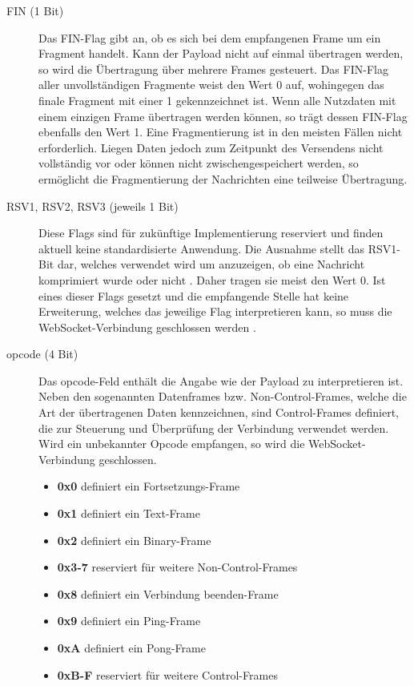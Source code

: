 \documentclass[11pt,a4paper,titlepage]{scrartcl}
\numberwithin{equation}{section}
\begin{document}
\begin{description}
	\item[FIN (1 Bit)] Das FIN-Flag gibt an, ob es sich bei dem empfangenen Frame um ein Fragment handelt. Kann der Payload nicht auf einmal übertragen werden, so wird die Übertragung über mehrere Frames gesteuert. Das FIN-Flag aller unvollständigen Fragmente weist den Wert 0 auf, wohingegen das finale Fragment mit einer 1 gekennzeichnet ist. Wenn alle Nutzdaten mit einem einzigen Frame übertragen werden können, so trägt dessen FIN-Flag ebenfalls den Wert 1. Eine Fragmentierung ist in den meisten Fällen nicht erforderlich. Liegen Daten jedoch zum Zeitpunkt des Versendens nicht vollständig vor oder können nicht zwischengespeichert werden, so ermöglicht die Fragmentierung der Nachrichten eine teilweise Übertragung. 
	\item[RSV1, RSV2, RSV3 (jeweils 1 Bit)] Diese Flags sind für zukünftige Implementierung reserviert und finden aktuell keine standardisierte Anwendung. Die Ausnahme stellt das RSV1-Bit dar, welches verwendet wird um anzuzeigen, ob eine Nachricht komprimiert wurde oder nicht \autocite{internet_assigned_numbers_authority_websocket_2011}. Daher tragen sie meist den Wert 0. Ist eines dieser Flags gesetzt und die empfangende Stelle hat keine Erweiterung, welches das jeweilige Flag interpretieren kann, so muss die WebSocket-Verbindung geschlossen werden \autocite[27]{fette_websocket_2011}. 
	\item[opcode (4 Bit)] Das opcode-Feld enthält die Angabe wie der Payload zu interpretieren ist. Neben den sogenannten Datenframes bzw. Non-Control-Frames, welche die Art der übertragenen Daten kennzeichnen, sind Control-Frames definiert, die zur Steuerung und Überprüfung der Verbindung verwendet werden. Wird ein unbekannter Opcode empfangen, so wird die WebSocket-Verbindung geschlossen.
	\begin{itemize}
		\item \textbf{0x0} definiert ein Fortsetzungs-Frame
		\item \textbf{0x1} definiert ein Text-Frame
		\item \textbf{0x2} definiert ein Binary-Frame
		\item \textbf{0x3-7} reserviert für weitere Non-Control-Frames
		\item \textbf{0x8} definiert ein Verbindung beenden-Frame
		\item \textbf{0x9} definiert ein Ping-Frame
		\item \textbf{0xA} definiert ein Pong-Frame
		\item \textbf{0xB-F} reserviert für weitere Control-Frames

\end{itemize}
\end{description}
\end{document}
